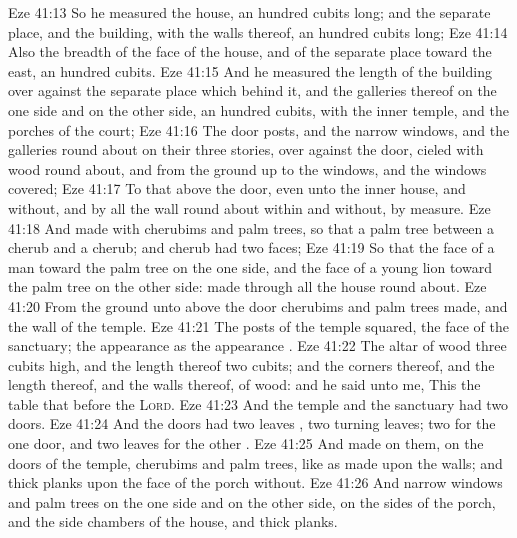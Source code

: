 \vs Eze 41:13 So he measured the house, an hundred cubits long; and the separate place, and the building, with the walls thereof, an hundred cubits long;
\vs Eze 41:14 Also the breadth of the face of the house, and of the separate place toward the east, an hundred cubits.
\vs Eze 41:15 And he measured the length of the building over against the separate place which  behind it, and the galleries thereof on the one side and on the other side, an hundred cubits, with the inner temple, and the porches of the court;
\vs Eze 41:16 The door posts, and the narrow windows, and the galleries round about on their three stories, over against the door, cieled with wood round about, and from the ground up to the windows, and the windows  covered;
\vs Eze 41:17 To that above the door, even unto the inner house, and without, and by all the wall round about within and without, by measure.
\vs Eze 41:18 And  made with cherubims and palm trees, so that a palm tree  between a cherub and a cherub; and  cherub had two faces;
\vs Eze 41:19 So that the face of a man  toward the palm tree on the one side, and the face of a young lion toward the palm tree on the other side:  made through all the house round about.
\vs Eze 41:20 From the ground unto above the door  cherubims and palm trees made, and  the wall of the temple.
\vs Eze 41:21 The posts of the temple  squared,  the face of the sanctuary; the appearance  as the appearance .
\vs Eze 41:22 The altar of wood  three cubits high, and the length thereof two cubits; and the corners thereof, and the length thereof, and the walls thereof,  of wood: and he said unto me, This  the table that  before the \textsc{Lord}.
\vs Eze 41:23 And the temple and the sanctuary had two doors.
\vs Eze 41:24 And the doors had two leaves , two turning leaves; two  for the one door, and two leaves for the other .
\vs Eze 41:25 And  made on them, on the doors of the temple, cherubims and palm trees, like as  made upon the walls; and  thick planks upon the face of the porch without.
\vs Eze 41:26 And  narrow windows and palm trees on the one side and on the other side, on the sides of the porch, and  the side chambers of the house, and thick planks.

